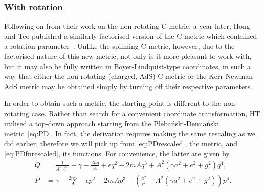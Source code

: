 \documentclass[
twoside,
openright,
frontopenright
]{dmathesis}
\newcommand{\nn}{\nonumber}
\newcommand{\PD}{Pleba\'nski-Demia\'nski}
\begin{document}
\subsubsection{With rotation}
Following on from their work on the non-rotating C-metric, a year later, Hong
and Teo published a similarly factorised version of the C-metric which contained
a rotation parameter~\cite{Hong:2004dm}. Unlike the spinning C-metric, however,
due to the factorised nature of this new metric, not only is it more pleasant to
work with, but it may also be fully written in Boyer-Lindquist-type coordinates,
in such a way that either the non-rotating (charged, AdS) C-metric or the
Kerr-Newman-AdS metric may be obtained simply by turning off their respective
parameters.

In order to obtain such a metric, the starting point is different to the
non-rotating case. Rather than search for a convenient coordinate
transformation, HT utilised a top-down approach starting from the \PD{}
metric~\eqref{eq:PD}. In fact, the derivation requires making the same rescaling
as we did earlier, therefore we will pick up from \cref{eq:PDrescaled}, the
metric, and \cref{eq:PDfnrescaled}, its functions. For convenience, the latter
are given by
\begin{align}
  Q &= \frac{1}{A^2\ell^2} - \gamma - \frac{2nq}{A} + \epsilon q^2 -
      2mAq^3 + A^2\left(\gamma a^2 + e^2 + g^2\right)q^4,\nn\\
  P &=  \gamma - \frac{2np}{A} - \epsilon p^2 -
      2mAp^3 + \left(\frac{a^2}{\ell^2} - A^2(\gamma a^2+e^2+g^2)\right)p^4.
\end{align}
\end{document}
